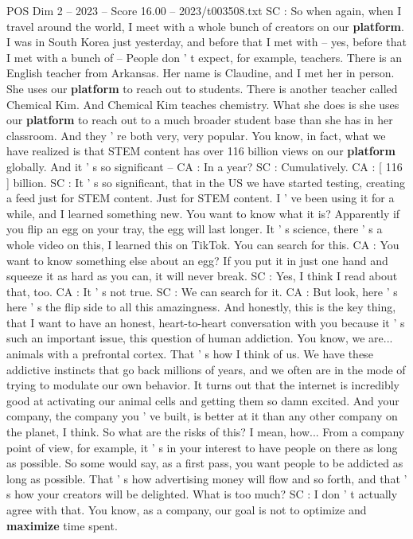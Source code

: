 \begin{textsample}{POS Dim 2 – 2023 – Score 16.00 – 2023/t003508.txt}
SC : So when again, when I travel around the world, I meet with a whole bunch of creators on our \textbf{platform}.
I was in South Korea just yesterday, and before that I met with -- yes, before that I met with a bunch of -- People don ' t expect, for example, teachers.
There is an English teacher from Arkansas.
Her name is Claudine, and I met her in person.
She uses our \textbf{platform} to reach out to students.
There is another teacher called Chemical Kim.
And Chemical Kim teaches chemistry.
What she does is she uses our \textbf{platform} to reach out to a much broader student base than she has in her classroom.
And they ' re both very, very popular.
You know, in fact, what we have realized is that STEM content has over 116 billion views on our \textbf{platform} globally.
And it ' s so significant -- CA : In a year?
SC : Cumulatively.
CA : [ 116 ] billion.
SC : It ' s so significant, that in the US we have started testing, creating a feed just for STEM content.
Just for STEM content.
I ' ve been using it for a while, and I learned something new.
You want to know what it is?
Apparently if you flip an egg on your tray, the egg will last longer.
It ' s science, there ' s a whole video on this, I learned this on TikTok.
You can search for this.
CA : You want to know something else about an egg?
If you put it in just one hand and squeeze it as hard as you can, it will never break.
SC : Yes, I think I read about that, too.
CA : It ' s not true.
SC : We can search for it.
CA : But look, here ' s here ' s the flip side to all this amazingness.
And honestly, this is the key thing, that I want to have an honest, heart-to-heart conversation with you because it ' s such an important issue, this question of human addiction.
You know, we are... animals with a prefrontal cortex.
That ' s how I think of us.
We have these addictive instincts that go back millions of years, and we often are in the mode of trying to modulate our own behavior.
It turns out that the internet is incredibly good at activating our animal cells and getting them so damn excited.
And your company, the company you ' ve built, is better at it than any other company on the planet, I think.
So what are the risks of this?
I mean, how...
From a company point of view, for example, it ' s in your interest to have people on there as long as possible.
So some would say, as a first pass, you want people to be addicted as long as possible.
That ' s how advertising money will flow and so forth, and that ' s how your creators will be delighted.
What is too much?
SC : I don ' t actually agree with that.
You know, as a company, our goal is not to optimize and \textbf{maximize} time spent.

\end{textsample}
